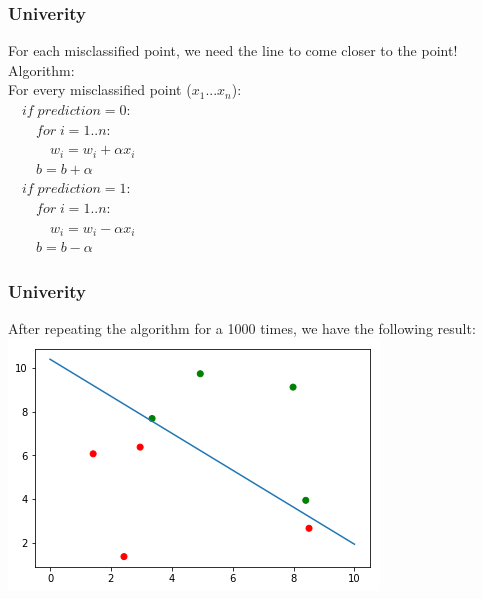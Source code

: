\begin{frame}[fragile]
  \frametitle{Univerity}
  For each misclassified point, we need the line to come closer to the point!\\
  \vspace{3mm}
  Algorithm:\\
  For every misclassified point ($x_1...x_n$):\\
  \vspace{2mm}
  $\quad if \; prediction = 0:$\\
  $\qquad for \; i=1..n:$\\
  $\qquad \quad w_i = w_i + \alpha x_i$\\
  $\qquad b = b + \alpha$\\
  \vspace{2mm}
  $\quad if \; prediction = 1:$\\
  $\qquad for \; i=1..n:$\\
  $\qquad \quad w_i = w_i - \alpha x_i$\\
  $\qquad b = b - \alpha$
\end{frame}

\begin{frame}[fragile]
  \frametitle{Univerity}
  After repeating the algorithm for a 1000 times, we have the following result:\\
  \vspace{3mm}
  \includegraphics[scale=0.4]{img/uni_data_4}
\end{frame}

